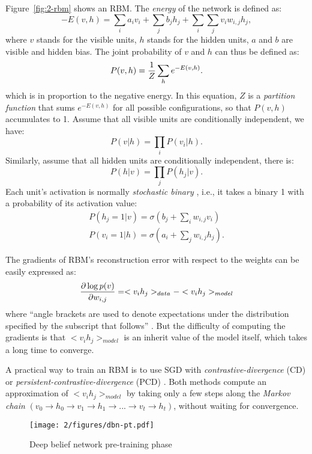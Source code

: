 Figure~\ref{fig:2-rbm} shows an RBM. The {\it energy} of the network is defined as:
\begin{equation}
-E(v,h) = \sum_i a_iv_i + \sum_j b_jh_j + \sum_i\sum_j v_iw_{i,j}h_j,
\end{equation}
where $v$ stands for the visible units, $h$ stands for the hidden units, $a$ and $b$ are visible and hidden bias. The joint probability of $v$ and $h$ can thus be defined as:
\begin{equation}
P(v,h) = {1\over Z} \sum_h e^{-E(v,h)}.
\end{equation}
which is in proportion to the negative energy. In this equation, $Z$ is a {\it partition function} that sums $e^{-E(v,h)}$ for all possible configurations, so that $P(v,h)$ accumulates to 1. Assume that all visible units are conditionally independent, we have:
\begin{equation}
P(v|h) = \prod_i P(v_i|h).
\end{equation}
Similarly, assume that all hidden units are conditionally independent, there is:
\begin{equation}
P(h|v) = \prod_j P(h_j|v).
\end{equation}
Each unit's activation is normally {\it stochastic binary} \cite{hinton2010practical}, i.e., it takes a binary 1 with a probability of its activation value:
\begin{equation}
\begin{split}
P(h_j=1|v) = \sigma(b_j+\sum_i w_{i,j}v_i) \\
P(v_i=1|h) = \sigma(a_i+\sum_j w_{i,j}h_j).
\end{split}
\end{equation}

The gradients of RBM's reconstruction error with respect to the weights can be easily expressed as:
\begin{equation}
{\partial \log p(v) \over \partial w_{i,j}} = <v_ih_j>_{data} - <v_ih_j>_{model}
\end{equation}
where ``angle brackets are used to denote expectations under the distribution specified by the subscript that follows'' \cite{hinton2010practical}. But the difficulty of computing the gradients is that $<v_ih_j>_{model}$ is an inherit value of the model itself, which takes a long time to converge.

A practical way to train an RBM is to use SGD with {\it contrastive-divergence} \cite{hinton2010practical} (CD) or {\it persistent-contrastive-divergence} (PCD) \cite{tieleman2008training}. Both methods compute an approximation of $<v_ih_j>_{model}$ by taking only a few steps along the {\it Markov chain} $(v_0\rightarrow h_0\rightarrow v_1\rightarrow h_1\rightarrow...\rightarrow v_t\rightarrow h_t)$, without waiting for convergence.
\begin{figure}[htb]
\centering
\texttt{[image: 2/figures/dbn-pt.pdf]}
\caption{Deep belief network pre-training phase}
\label{fig:2-dbn-pt}
\end{figure}

